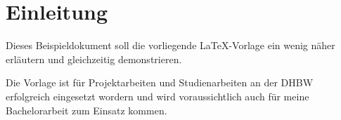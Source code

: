 \chapter{Einleitung}

Dieses Beispieldokument soll die vorliegende \LaTeX-Vorlage ein wenig näher erläutern und
gleichzeitig demonstrieren.

Die Vorlage ist für Projektarbeiten und Studienarbeiten an der DHBW erfolgreich eingesetzt
wordern und wird voraussichtlich auch für meine Bachelorarbeit zum Einsatz kommen.
